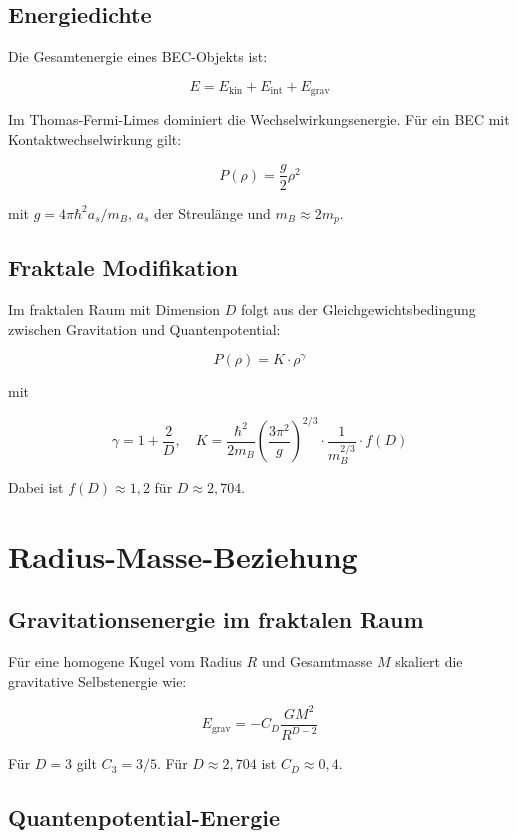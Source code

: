 \subsection{Energiedichte}
\label{sub:bec_energie}

Die Gesamtenergie eines BEC-Objekts ist:

\[
E = E_{\text{kin}} + E_{\text{int}} + E_{\text{grav}} \tag{K.5}
\]

Im Thomas-Fermi-Limes dominiert die Wechselwirkungsenergie. 
Für ein BEC mit Kontaktwechselwirkung gilt:

\[
P(\rho) = \frac{g}{2} \rho^2 \tag{K.6}
\]

mit \( g = 4\pi\hbar^2 a_s / m_B \), \( a_s \) der Streulänge und 
\( m_B \approx 2m_p \).

\subsection{Fraktale Modifikation}
\label{sub:bec_fraktal}

Im fraktalen Raum mit Dimension \( D \) folgt aus der Gleichgewichtsbedingung 
zwischen Gravitation und Quantenpotential:

\[
P(\rho) = K \cdot \rho^{\gamma} \tag{K.7}
\]

mit

\[
\gamma = 1 + \frac{2}{D}, \quad 
K = \frac{\hbar^2}{2m_B} \left( \frac{3\pi^2}{g} \right)^{2/3} \cdot 
\frac{1}{m_B^{2/3}} \cdot f(D) \tag{K.8}
\]

Dabei ist \( f(D) \approx 1,2 \) für \( D \approx 2,704 \).

\section{Radius-Masse-Beziehung}
\label{app:bec_radius_masse}

\subsection{Gravitationsenergie im fraktalen Raum}
\label{sub:bec_grav_energie}

Für eine homogene Kugel vom Radius \( R \) und Gesamtmasse \( M \) 
skaliert die gravitative Selbstenergie wie:

\[
E_{\text{grav}} = -C_D \frac{GM^2}{R^{D-2}} \tag{K.9}
\]

Für \( D = 3 \) gilt \( C_3 = 3/5 \). Für \( D \approx 2,704 \) ist 
\( C_D \approx 0,4 \).

\subsection{Quantenpotential-Energie}
\label{sub:bec_q_energie}

